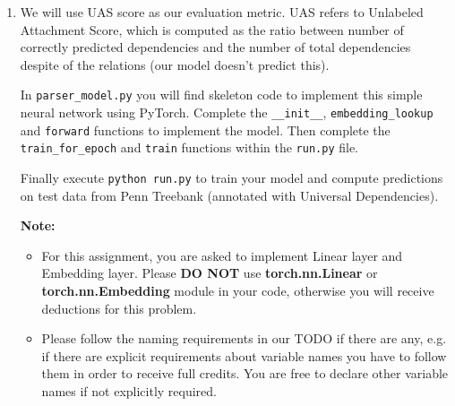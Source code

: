 \begin{parts}
\begin{enumerate}[label=\roman*.]

        \item We will use UAS score as our evaluation metric. UAS refers to Unlabeled Attachment Score, which is computed as the ratio between number of correctly predicted dependencies and the number of total dependencies despite of the relations (our model doesn't predict this).\newline
    
   In \texttt{parser\_model.py} you will find skeleton code to implement this simple neural network using PyTorch. Complete the \texttt{\_\_init\_\_}, \texttt{embedding\_lookup} and \texttt{forward} functions to implement the model. Then complete the \texttt{train\_for\_epoch} and \texttt{train} functions within the \texttt{run.py} file.
   
    Finally execute \texttt{python run.py} to train your model and compute predictions
    on test data from Penn Treebank (annotated with Universal Dependencies). 
    
    \textbf{Note:}
    \begin{itemize}
        \item For this assignment, you are asked to implement Linear layer and Embedding layer. Please \textbf{DO NOT} use \textbf{torch.nn.Linear} or  \textbf{torch.nn.Embedding} module in your code, otherwise you will receive deductions for this problem. 
        \item Please follow the naming requirements in our TODO if there are any, e.g. if there are explicit requirements about variable names you have to follow them in order to receive full credits. You are free to declare other variable names if not explicitly required. 
    \end{itemize}
    

\end{enumerate}
\end{parts}
